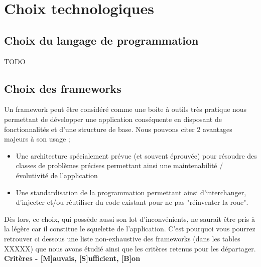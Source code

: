 \section{Choix technologiques}


\subsection*{Choix du langage de programmation}

TODO

\subsection*{Choix des frameworks}

Un framework peut être considéré comme une boite à outils très pratique nous permettant de développer une application conséquente en disposant de fonctionnalités et d'une structure de base. Nous pouvons citer 2 avantages majeurs à son usage ; 
\begin{itemize}
    \item Une architecture spécialement prévue (et souvent éprouvée) pour résoudre des classes de problèmes précises permettant ainsi une maintenabilité / évolutivité  de l'application
    \item Une standardisation de la programmation permettant ainsi d'interchanger, d'injecter et/ou réutiliser du code existant pour ne pas "réinventer la roue".
\end{itemize}
Dès lors, ce choix, qui possède aussi son lot d'inconvénients, ne saurait être pris à la légère car il constitue le squelette de l'application. C'est pourquoi vous pourrez retrouver ci dessous une liste non-exhaustive des frameworks (dans les tables XXXXX) que nous avons étudié ainsi que les critères retenus pour les départager. \\

\noindent\textbf{Critères - [M]auvais, [S]ufficient, [B]on}

